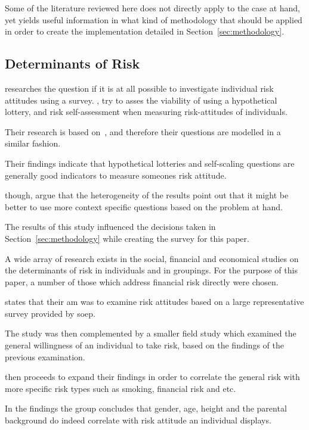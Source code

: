 \documentclass[12pt]{article}
\begin{document}
Some of the literature reviewed here does not directly apply to the case at hand, yet yields useful information in what kind of methodology that should be applied in order to create the implementation detailed in Section~\ref{sec:methodology}.

\subsection{Determinants of Risk}
\label{sub:determinants_risks}

\citet{dp4807.pdf} researches the question if it is at all possible to investigate individual risk attitudes using a survey. \citet{dp4807.pdf}, try to asses the viability of using a hypothetical lottery, and risk self-assessment when measuring risk-attitudes of individuals. 

Their research is based on~\citet{individualRiskAttitudes}, and therefore their questions are modelled in a similar fashion. 

Their findings indicate that hypothetical lotteries and self-scaling questions are generally good indicators to measure someones risk attitude. 

\citet{dp4807.pdf} though, argue that the heterogeneity of the results point out that it might be better to use more context specific questions based on the problem at hand. 

The results of this study influenced the decisions taken in Section~\ref{sec:methodology} while creating the survey for this paper.

A wide array of research exists in the social, financial and economical studies on the determinants of risk in individuals and in groupings. For the purpose of this paper, a number of those which address financial risk directly were chosen.

\citet{individualRiskAttitudes} states that their am was to examine risk attitudes based on a large representative survey provided by \gls{soep}\@. 

The study was then complemented by a smaller field study which examined the general willingness of an individual to take risk, based on the findings of the previous examination. 

\citet{individualRiskAttitudes} then proceeds to expand their findings in order to correlate the general risk with more specific risk types such as smoking, financial risk and etc. 

In the findings the group concludes that gender, age, height and the parental background do indeed correlate with risk attitude an individual displays. 
\end{document}
